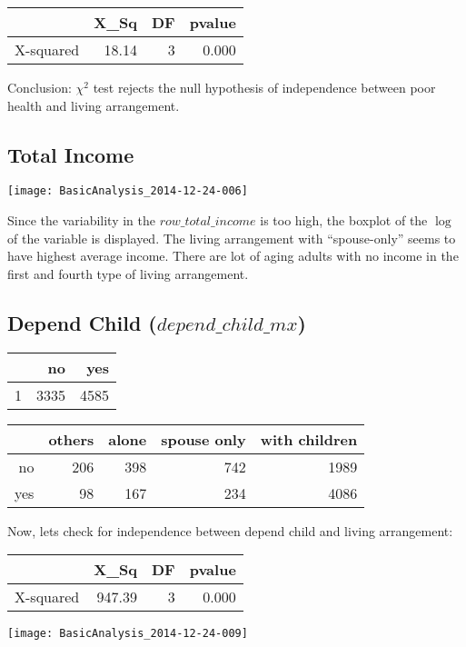 \documentclass[11pt]{article}
\begin{document}
\begin{table}[ht]
\centering
\begin{tabular}{rrrr}
  \hline
 & X\_Sq & DF & pvalue \\ 
  \hline
X-squared & 18.14 & 3 & 0.000 \\ 
   \hline
\end{tabular}
\end{table}Conclusion: $\chi^2$ test rejects the null hypothesis of independence between poor health and living arrangement. 

\newpage
\subsection*{Total Income}
\begin{center}
\texttt{[image: BasicAnalysis\_2014-12-24-006]}
\end{center}
Since the variability in the $row\_total\_income$ is too high, the boxplot of the $\log$ of the variable is displayed. The living arrangement with ``spouse-only'' seems to have highest average income. There are lot of aging adults with no income in the first and fourth type of living arrangement.


\newpage
\subsection*{Depend Child ($depend\_child\_mx$)}
\begin{table}[ht]
\centering
\begin{tabular}{rrr}
  \hline
 & no & yes \\ 
  \hline
1 & 3335 & 4585 \\ 
   \hline
\end{tabular}
\end{table}%
\begin{table}[ht]
\centering
\begin{tabular}{rrrrr}
  \hline
 & others & alone & spouse only & with children \\ 
  \hline
no & 206 & 398 & 742 & 1989 \\ 
  yes &  98 & 167 & 234 & 4086 \\ 
   \hline
\end{tabular}
\end{table}Now, lets check for independence between depend child and living arrangement:
\begin{table}[ht]
\centering
\begin{tabular}{rrrr}
  \hline
 & X\_Sq & DF & pvalue \\ 
  \hline
X-squared & 947.39 & 3 & 0.000 \\ 
   \hline
\end{tabular}
\end{table}
\begin{center}
\texttt{[image: BasicAnalysis\_2014-12-24-009]}
\end{center}
\end{document}
